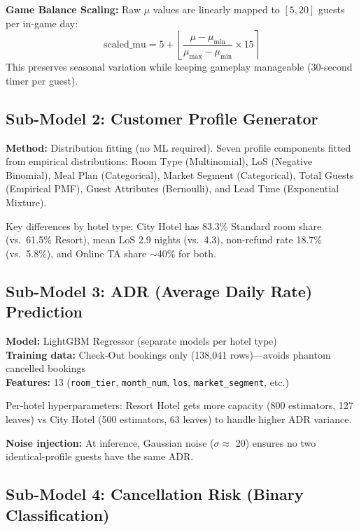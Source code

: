 \documentclass[12pt,a4paper,openany]{report}
\begin{document}
\textbf{Game Balance Scaling:} Raw $\mu$ values are linearly mapped to $[5, 20]$ guests per in-game day:
\begin{equation}
\text{scaled\_mu} = 5 + \left\lfloor \frac{\mu - \mu_{\min}}{\mu_{\max} - \mu_{\min}} \times 15 \right\rceil
\end{equation}
This preserves seasonal variation while keeping gameplay manageable (30-second timer per guest).

\subsection{Sub-Model 2: Customer Profile Generator}

\textbf{Method:} Distribution fitting (no ML required). Seven profile components fitted from empirical distributions: Room Type (Multinomial), LoS (Negative Binomial), Meal Plan (Categorical), Market Segment (Categorical), Total Guests (Empirical PMF), Guest Attributes (Bernoulli), and Lead Time (Exponential Mixture).

Key differences by hotel type: City Hotel has 83.3\% Standard room share (vs.\ 61.5\% Resort), mean LoS 2.9 nights (vs.\ 4.3), non-refund rate 18.7\% (vs.\ 5.8\%), and Online TA share $\sim$40\% for both.

\subsection{Sub-Model 3: ADR (Average Daily Rate) Prediction}

\textbf{Model:} LightGBM Regressor (separate models per hotel type)\\
\textbf{Training data:} Check-Out bookings only (138,041 rows)---avoids phantom cancelled bookings\\
\textbf{Features:} 13 (\texttt{room\_tier}, \texttt{month\_num}, \texttt{los}, \texttt{market\_segment}, etc.)

Per-hotel hyperparameters: Resort Hotel gets more capacity (800 estimators, 127 leaves) vs City Hotel (500 estimators, 63 leaves) to handle higher ADR variance.

\textbf{Noise injection:} At inference, Gaussian noise ($\sigma \approx$ \texteuro{}20) ensures no two identical-profile guests have the same ADR.

\subsection{Sub-Model 4: Cancellation Risk (Binary Classification)}
\end{document}
